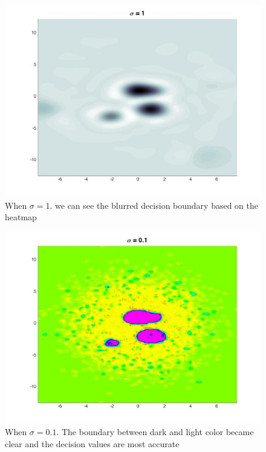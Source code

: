 \documentclass[twoside]{article}
\theoremstyle{definition}
\theoremstyle{definition}
\theoremstyle{remark}
\begin{document}
\begin{figure}[H]
\centering
\includegraphics[width=120mm]{sigma_1.jpg}
\caption{ When $\sigma = 1$. we can see the blurred decision boundary based on the heatmap\label{problem2Pic3}}
\end{figure}

\begin{figure}[H]
\centering
\includegraphics[width=120mm]{sigma_01.jpg}
\caption{ When $\sigma = 0.1$. The boundary between dark and light color became clear and the decision values are most accurate\label{problem2Pic4}}
\end{figure}
\end{document}
